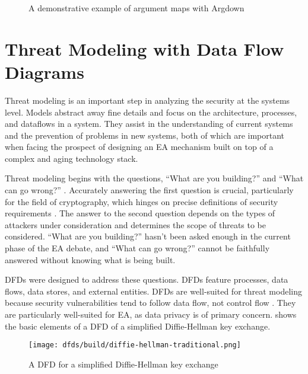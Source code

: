 \begin{figure}[h]
    \centering\CaptionFontSize
    \caption{A demonstrative example of argument maps with Argdown}
    \label{fig-args-key}
\end{figure}


\section{Threat Modeling with Data Flow Diagrams}
\label{sec-threat-model-intro}

Threat modeling is an important step in analyzing the security at the systems level. Models abstract away fine details
and focus on the architecture, processes, and dataflows in a system. They assist in the understanding of current systems
and the prevention of problems in new systems, both of which are important when facing the prospect of designing an
\ac{EA} mechanism built on top of a complex and aging technology stack.

Threat modeling begins with the questions, ``What are you building?'' and ``What can go wrong?''
\cite{shostack_threat_2014}. Accurately answering the first question is crucial, particularly for the field of
cryptography, which hinges on precise definitions of security requirements \cite{varia_2018}. The answer to the second
question depends on the types of attackers under consideration and determines the scope of threats to be considered.
``What are you building?'' hasn't been asked enough in the current phase of the \ac{EA} debate, and ``What can go
wrong?'' cannot be faithfully answered without knowing what is being built.

\Acp{DFD} were designed to address these questions. \Acp{DFD} feature processes, data flows, data stores, and external
entities. \Acp{DFD} are well-suited for threat modeling because security vulnerabilities tend to follow data flow, not
control flow \cite{shostack_threat_2014}. They are particularly well-suited for \ac{EA}, as data privacy is of primary
concern.  shows the basic elements of a \ac{DFD} of a simplified Diffie-Hellman key
exchange.

\begin{figure}[h]
    \centering\CaptionFontSize
    \texttt{[image: dfds/build/diffie-hellman-traditional.png]}
    \caption{A \acf{DFD} for a simplified Diffie-Hellman key exchange}
    \label{fig-dfd-dh-traditional}
\end{figure}

